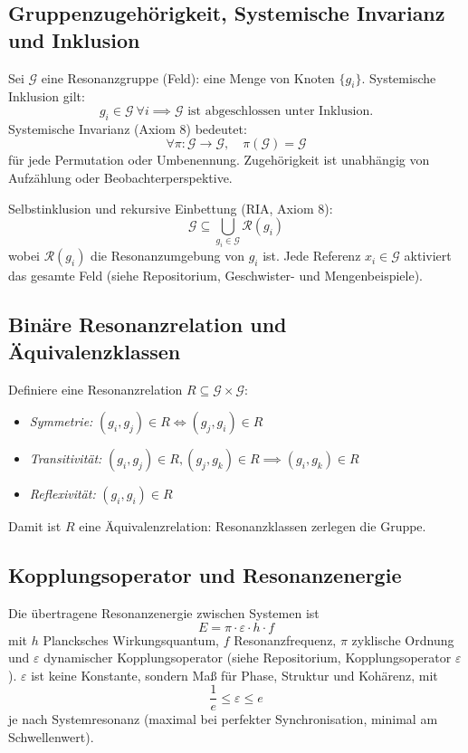 \documentclass[12pt]{article}
\begin{document}
\subsection{Gruppenzugehörigkeit, Systemische Invarianz und Inklusion}

Sei $\mathcal{G}$ eine Resonanzgruppe (Feld): eine Menge von Knoten $\{g_i\}$. Systemische Inklusion gilt:
\[
g_i \in \mathcal{G}\ \forall i \implies \mathcal{G} \text{ ist abgeschlossen unter Inklusion.}
\]
Systemische Invarianz (Axiom 8) bedeutet:
\[
\forall \pi : \mathcal{G} \to \mathcal{G},\quad \pi(\mathcal{G}) = \mathcal{G}
\]
für jede Permutation oder Umbenennung. Zugehörigkeit ist unabhängig von Aufzählung oder Beobachterperspektive.

Selbstinklusion und rekursive Einbettung (RIA, Axiom 8):
\[
\mathcal{G} \subseteq \bigcup_{g_i \in \mathcal{G}} \mathcal{R}(g_i)
\]
wobei $\mathcal{R}(g_i)$ die Resonanzumgebung von $g_i$ ist. Jede Referenz $x_i \in \mathcal{G}$ aktiviert das gesamte Feld (siehe Repositorium, Geschwister- und Mengenbeispiele).

\subsection{Binäre Resonanzrelation und Äquivalenzklassen}

Definiere eine Resonanzrelation $R \subseteq \mathcal{G} \times \mathcal{G}$:
\begin{itemize}
	\item \textit{Symmetrie:} $(g_i, g_j) \in R \iff (g_j, g_i) \in R$
	\item \textit{Transitivität:} $(g_i, g_j) \in R, (g_j, g_k) \in R \implies (g_i, g_k) \in R$
	\item \textit{Reflexivität:} $(g_i, g_i) \in R$
\end{itemize}
Damit ist $R$ eine Äquivalenzrelation: Resonanzklassen zerlegen die Gruppe.

\subsection{Kopplungsoperator und Resonanzenergie}

Die übertragene Resonanzenergie zwischen Systemen ist
\[
E = \pi \cdot \varepsilon \cdot h \cdot f
\]
mit $h$ Plancksches Wirkungsquantum, $f$ Resonanzfrequenz, $\pi$ zyklische Ordnung und $\varepsilon$ dynamischer Kopplungsoperator (siehe Repositorium, Kopplungsoperator $\varepsilon$). $\varepsilon$ ist keine Konstante, sondern Maß für Phase, Struktur und Kohärenz, mit
\[
\frac{1}{e} \leq \varepsilon \leq e
\]
je nach Systemresonanz (maximal bei perfekter Synchronisation, minimal am Schwellenwert).
\end{document}
